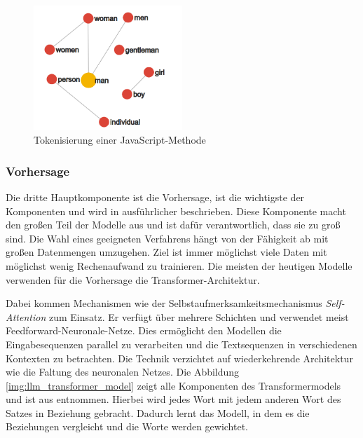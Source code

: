 \begin{center}
	\begin{figure}[!ht]
		\includegraphics[width=0.5\textwidth]{content/chapter_basics/images/tokenize_transformation.png}
		\centering
		\caption{Tokenisierung einer JavaScript-Methode}
		\label{img:tokenize_transformation}
	\end{figure}
\end{center}


\subsubsection{Vorhersage}
Die dritte Hauptkomponente ist die Vorhersage, ist die wichtigste der Komponenten und wird in \cite{vaswani-2017} ausführlicher beschrieben. Diese Komponente macht den großen Teil der Modelle aus und ist dafür verantwortlich, dass sie zu groß sind. Die Wahl eines geeigneten Verfahrens hängt von der Fähigkeit ab mit großen Datenmengen umzugehen. Ziel ist immer möglichst viele Daten mit möglichst wenig Rechenaufwand zu trainieren. Die meisten der heutigen Modelle verwenden für die Vorhersage die Transformer-Architektur.\vspace{0.2cm}

Dabei kommen Mechanismen wie der Selbstaufmerksamkeitsmechanismus \textit{Self-Attention} zum Einsatz. Er verfügt über mehrere Schichten und verwendet meist Feedforward-Neuronale-Netze. Dies ermöglicht den Modellen die Eingabesequenzen parallel zu verarbeiten und die Textsequenzen in verschiedenen Kontexten zu betrachten. Die Technik verzichtet auf wiederkehrende Architektur wie die Faltung des neuronalen Netzes. Die Abbildung \ref{img:llm_transformer_model} zeigt alle Komponenten des Transformermodels und ist aus \cite{vaswani-2017} entnommen. Hierbei wird jedes Wort mit jedem anderen Wort des Satzes in Beziehung gebracht. Dadurch lernt das Modell, in dem es die Beziehungen vergleicht und die Worte werden gewichtet.\vspace{0.2cm}

